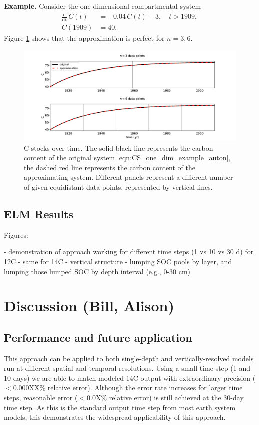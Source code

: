 \documentclass[11pt,a4paper]{article}
\newcommand{\deriv}[1]{\frac{\mathrm{d}}{\mathrm{d}#1}}
\begin{document}
\textbf{Example.}
Consider the one-dimensional compartmental system
\begin{equation}\label{eqn:CS_one_dim_example_auton}
    \begin{aligned}
        \deriv{t}\,C(t) &= -0.04\,C(t) + 3,\quad t>1909,\\
        C(1909) &= 40.
    \end{aligned}
\end{equation}
Figure \ref{fig:CS_one_dim_example_auton} shows that the approximation is perfect for $n=3,6$.
\begin{figure}[htbp]
    \centering 
    \includegraphics[width=1.0\linewidth]{figs/interpol_pwc_1_auton.pdf}
    \caption{C stocks over time.
        The solid black line represents the carbon content of the original system \eqref{eqn:CS_one_dim_example_auton}, the dashed red line represents the carbon content of the approximating system.
        Different panels represent a different number of given equidistant data points, represented by vertical lines.
        }
    \label{fig:CS_one_dim_example_auton}
\end{figure}        

\subsection{ELM Results}
Figures:

- demonstration of approach working for different time steps (1 vs 10 vs 30 d) for 12C
-     same for 14C
- vertical structure
- lumping SOC pools by layer, and lumping those lumped SOC by depth interval (e.g., 0-30 cm)

\section*{Discussion (Bill, Alison)}

\subsection{Performance and future application }
This approach can be applied to both single-depth and vertically-resolved models run at different spatial and temporal resolutions. Using a small time-step (1 and 10 days) we are able to match modeled 14C output with extraordinary precision ($<$0.000XX\% relative error). Although the error rate increases for larger time steps, reasonable error ($<$0.0X\% relative error) is still achieved at the 30-day time step. As this is the standard output time step from most earth system models, this demonstrates the widespread applicability of this approach. 
\end{document}
